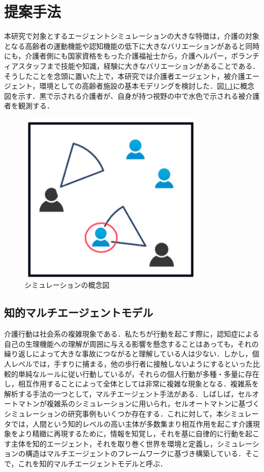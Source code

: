 \chapter{提案手法}

本研究で対象とするエージェントシミュレーションの大きな特徴は，介護の対象となる高齢者の運動機能や認知機能の低下に大きなバリエーションがあると同時にも，介護者側にも国家資格をもった介護福祉士から，介護ヘルパー，ボランチィアスタッフまで技能や知識，経験に大きなバリエーションがあることである．そうしたことを念頭に置いた上で，本研究では介護者エージェント，被介護エージェント，環境としての高齢者施設の基本モデリングを検討した．図\ref{concept_simulation}に概念図を示す．黒で示される介護者が、自身が持つ視野の中で水色で示される被介護者を観測する．

\begin{figure}[htb]
\begin{center}
\includegraphics[scale=2.0]{figures/concept_simulation.png}
\caption[シミュレーションの概念図]{シミュレーションの概念図 \label{concept_simulation}}
\end{center}
\end{figure}

\section{知的マルチエージェントモデル}

介護行動は社会系の複雑現象である．私たちが行動を起こす際に，認知症による自己の生理機能への理解が周囲に与える影響を懸念することはあっても，それの繰り返しによって大きな事故につながると理解している人は少ない．しかし，個人レベルでは，手すりに捕まる，他の歩行者に接触しないようにするといった比較的単純なルールに従い行動しているが，それらの個人行動が多種・多量に存在し，相互作用することによって全体としては非常に複雑な現象となる．複雑系を解析する手法の一つとして，マルチエージェント手法がある．しばしば，セルオートマトンが複雑系のシミュレーションに用いられ，セルオートマトンに基づくシミュレーションの研究事例もいくつか存在する．これに対して，本シミュレータでは，人間という知的レベルの高い主体が多数集まり相互作用を起こす介護現象をより精緻に再現するために，情報を知覚し，それを基に自律的に行動を起こす主体を知的エージェント，それを取り巻く世界を環境と定義し，シミュレーションの構造はマルチエージェントのフレームワークに基づき構築している．そこで，これを知的マルチエージェントモデルと呼ぶ．

